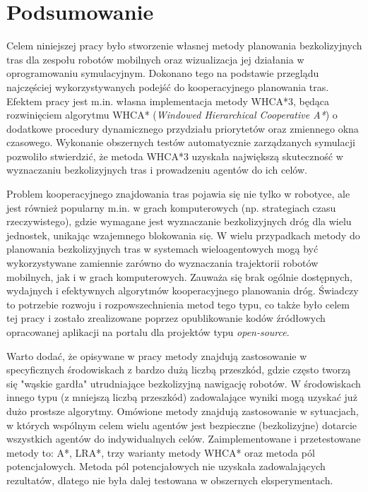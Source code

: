 \chapter{Podsumowanie}
\label{ch:podsumowanie}
Celem niniejszej pracy było stworzenie własnej metody planowania bezkolizyjnych tras dla zespołu robotów mobilnych oraz wizualizacja jej działania w oprogramowaniu symulacyjnym.
Dokonano tego na podstawie przeglądu najczęściej wykorzystywanych podejść do kooperacyjnego planowania tras.
Efektem pracy jest m.in. własna implementacja metody WHCA*3, będąca rozwinięciem algorytmu WHCA* ({\it Windowed Hierarchical Cooperative A*}) o dodatkowe procedury dynamicznego przydziału priorytetów oraz zmiennego okna czasowego.
Wykonanie obszernych testów automatycznie zarządzanych symulacji pozwoliło stwierdzić, że metoda WHCA*3 uzyskała największą skuteczność w wyznaczaniu bezkolizyjnych tras i prowadzeniu agentów do ich celów.

Problem kooperacyjnego znajdowania tras pojawia się nie tylko w robotyce, ale jest również popularny m.in. w grach komputerowych (np. strategiach czasu rzeczywistego), gdzie wymagane jest wyznaczanie bezkolizyjnych dróg dla wielu jednostek, unikając wzajemnego blokowania się.
W wielu przypadkach metody do planowania bezkolizyjnych tras w systemach wieloagentowych mogą być wykorzystywane zamiennie zarówno do wyznaczania trajektorii robotów mobilnych, jak i w grach komputerowych.
Zauważa się brak ogólnie dostępnych, wydajnych i efektywnych algorytmów kooperacyjnego planowania dróg.
Świadczy to potrzebie rozwoju i rozpowszechnienia metod tego typu, co także było celem tej pracy i zostało zrealizowane poprzez opublikowanie kodów źródłowych opracowanej aplikacji na portalu dla projektów typu {\it open-source}.

Warto dodać, że opisywane w pracy metody znajdują zastosowanie w specyficznych środowiskach z bardzo dużą liczbą przeszkód, gdzie często tworzą się "wąskie gardła" utrudniające bezkolizyjną nawigację robotów.
W środowiskach innego typu (z mniejszą liczbą przeszkód) zadowalające wyniki mogą uzyskać już dużo prostsze algorytmy.
Omówione metody znajdują zastosowanie w sytuacjach, w których wspólnym celem wielu agentów jest bezpieczne (bezkolizyjne) dotarcie wszystkich agentów do indywidualnych celów.
Zaimplementowane i przetestowane metody to: A*, LRA*, trzy warianty metody WHCA* oraz metoda pól potencjałowych.
Metoda pól potencjałowych nie uzyskała zadowalających rezultatów, dlatego nie była dalej testowana w obszernych eksperymentach.

